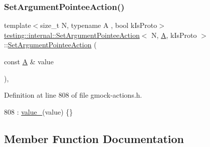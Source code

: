 \subsubsection{\texorpdfstring{Set\+Argument\+Pointee\+Action()}{SetArgumentPointeeAction()}}
{\footnotesize\ttfamily template$<$size\+\_\+t N, typename A , bool k\+Is\+Proto$>$ \\
\hyperlink{classtesting_1_1internal_1_1SetArgumentPointeeAction}{testing\+::internal\+::\+Set\+Argument\+Pointee\+Action}$<$ N, \hyperlink{namespacetesting_a5e9134d655d2fc9323902348083282e7}{A}, k\+Is\+Proto $>$\+::\hyperlink{classtesting_1_1internal_1_1SetArgumentPointeeAction}{Set\+Argument\+Pointee\+Action} (\begin{DoxyParamCaption}\item[{const \hyperlink{namespacetesting_a5e9134d655d2fc9323902348083282e7}{A} \&}]{value }\end{DoxyParamCaption})\hspace{0.3cm}{\ttfamily [inline]}, {\ttfamily [explicit]}}



Definition at line 808 of file gmock-\/actions.\+h.


\begin{DoxyCode}
808 : \hyperlink{classtesting_1_1internal_1_1SetArgumentPointeeAction_a57dba59652a5ea603c5e12c72e195b13}{value\_}(value) \{\}
\end{DoxyCode}


\subsection{Member Function Documentation}
\mbox{\label{classtesting_1_1internal_1_1SetArgumentPointeeAction_ae2680fa62fa184b56c88743141baac60}} 
